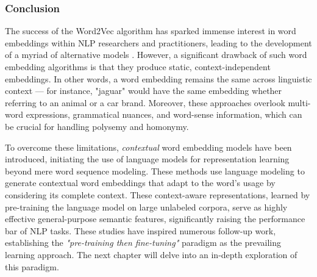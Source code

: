 
\subsubsection{Conclusion}

The success of the Word2Vec algorithm \citep{mikolov2013efficient} has sparked immense interest in word embeddings within \ac{NLP} researchers and practitioners, leading to the development of a myriad of alternative models \citep{pennington2014glove, shazeer2016swivel, bojanowski2017enriching}. However, a significant drawback of such word embedding algorithms is that they produce static, context-independent embeddings. In other words, a word embedding remains the same across linguistic context — for instance, "jaguar" would have the same embedding whether referring to an animal or a car brand. Moreover, these approaches overlook multi-word expressions, grammatical nuances, and word-sense information, which can be crucial for handling polysemy and homonymy.

To overcome these limitations, \textit{contextual} word embedding models have been introduced, initiating the use of language models for representation learning beyond mere word sequence modeling. These methods use language modeling to generate contextual word embeddings that adapt to the word's usage by considering its complete context. These context-aware representations, learned by pre-training the language model on large unlabeled corpora, serve as highly effective general-purpose semantic features, significantly raising the performance bar of \ac{NLP} tasks. These studies have inspired numerous follow-up work, establishing the \textit{"pre-training then fine-tuning"} paradigm as the prevailing learning approach. The next chapter will delve into an in-depth exploration of this paradigm.

